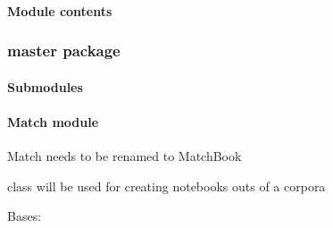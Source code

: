 \documentclass[letterpaper,10pt,english]{sphinxmanual}
\begin{document}
\paragraph{Module contents}
\label{\detokenize{src.expression:module-src.expression}}\label{\detokenize{src.expression:module-contents}}

\subsubsection{master package}
\label{\detokenize{src.master:master-package}}\label{\detokenize{src.master::doc}}

\paragraph{Submodules}
\label{\detokenize{src.master:submodules}}

\paragraph{Match module}
\label{\detokenize{src.master:match-module}}
Match needs to be renamed to MatchBook

 class will be used for creating notebooks outs of a corpora

\label{\detokenize{src.master:module-src.master.Match}}

\begin{fulllineitems}
\label{\detokenize{src.master:src.master.Match.Match}}
Bases: 

\end{fulllineitems}

\end{document}
